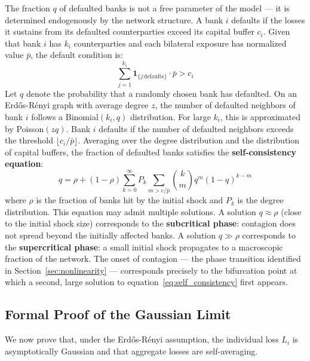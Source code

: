 \documentclass[a4paper,12pt,twoside]{article}
\begin{document}
The fraction $q$ of defaulted banks is not a free parameter of the 
model — it is determined endogenously by the network structure. A bank 
$i$ defaults if the losses it sustains from its defaulted counterparties 
exceed its capital buffer $c_i$. Given that bank $i$ has $k_i$ 
counterparties and each bilateral exposure has normalized value 
$\bar{p}$, the default condition is:
\begin{equation}
    \sum_{j=1}^{k_i} \mathbf{1}_{\{j \,\text{defaults}\}} \cdot \bar{p} 
    > c_i
    \label{eq:default_condition_annex}
\end{equation}
Let $q$ denote the probability that a randomly chosen bank has 
defaulted. On an Erdős-Rényi graph with average degree $z$, the number 
of defaulted neighbors of bank $i$ follows a Binomial$(k_i, q)$ 
distribution. For large $k_i$, this is approximated by Poisson$(zq)$. 
Bank $i$ defaults if the number of defaulted neighbors exceeds the 
threshold $\lfloor c_i / \bar{p} \rfloor$. Averaging over the degree 
distribution and the distribution of capital buffers, the fraction of 
defaulted banks satisfies the \textbf{self-consistency equation}:
\begin{equation}
    q = \rho + (1 - \rho) \sum_{k=0}^{\infty} P_k 
    \sum_{m > c/\bar{p}} \binom{k}{m} q^m (1-q)^{k-m}
    \label{eq:self_consistency}
\end{equation}
where $\rho$ is the fraction of banks hit by the initial shock and 
$P_k$ is the degree distribution. This equation may admit multiple 
solutions. A solution $q \approx \rho$ (close to the initial shock 
size) corresponds to the \textbf{subcritical phase}: contagion does 
not spread beyond the initially affected banks. A solution $q \gg \rho$ 
corresponds to the \textbf{supercritical phase}: a small initial shock 
propagates to a macroscopic fraction of the network. The onset of 
contagion — the phase transition identified in 
Section~\ref{sec:nonlinearity} — corresponds precisely to the 
bifurcation point at which a second, large solution to 
equation~\eqref{eq:self_consistency} first appears.

\subsection{Formal Proof of the Gaussian Limit}
\label{sec:gaussian_proof}

We now prove that, under the Erdős-Rényi assumption, the individual 
loss $L_i$ is asymptotically Gaussian and that aggregate losses are 
self-averaging.
\end{document}
